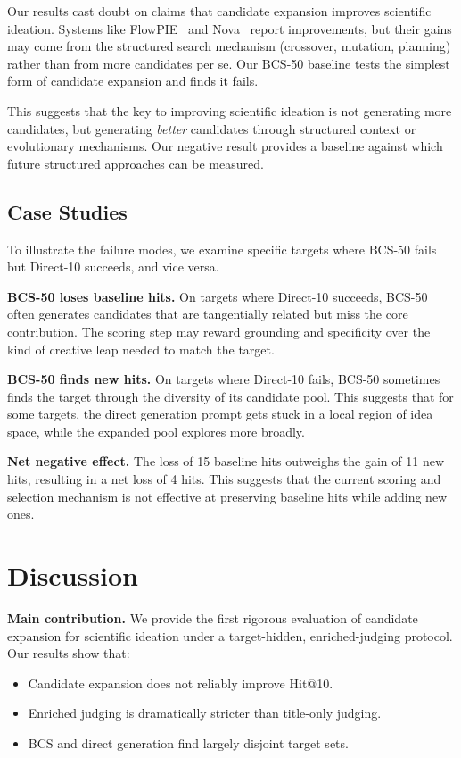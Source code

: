 \documentclass[wcp]{jmlr}
\begin{document}
Our results cast doubt on claims that candidate expansion improves scientific ideation. Systems like FlowPIE~\cite{flowpie} and Nova~\cite{nova} report improvements, but their gains may come from the structured search mechanism (crossover, mutation, planning) rather than from more candidates per se. Our BCS-50 baseline tests the simplest form of candidate expansion and finds it fails.

This suggests that the key to improving scientific ideation is not generating more candidates, but generating \emph{better} candidates through structured context or evolutionary mechanisms. Our negative result provides a baseline against which future structured approaches can be measured.

\subsection{Case Studies}

To illustrate the failure modes, we examine specific targets where BCS-50 fails but Direct-10 succeeds, and vice versa.

\textbf{BCS-50 loses baseline hits.} On targets where Direct-10 succeeds, BCS-50 often generates candidates that are tangentially related but miss the core contribution. The scoring step may reward grounding and specificity over the kind of creative leap needed to match the target.

\textbf{BCS-50 finds new hits.} On targets where Direct-10 fails, BCS-50 sometimes finds the target through the diversity of its candidate pool. This suggests that for some targets, the direct generation prompt gets stuck in a local region of idea space, while the expanded pool explores more broadly.

\textbf{Net negative effect.} The loss of 15 baseline hits outweighs the gain of 11 new hits, resulting in a net loss of 4 hits. This suggests that the current scoring and selection mechanism is not effective at preserving baseline hits while adding new ones.

\section{Discussion}\label{sec:discussion}

\textbf{Main contribution.} We provide the first rigorous evaluation of candidate expansion for scientific ideation under a target-hidden, enriched-judging protocol. Our results show that:

\begin{itemize}
\item Candidate expansion does not reliably improve Hit@10.
\item Enriched judging is dramatically stricter than title-only judging.
\item BCS and direct generation find largely disjoint target sets.
\end{itemize}
\end{document}
